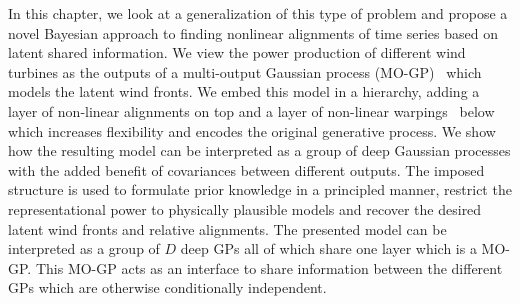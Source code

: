 In this chapter, we look at a generalization of this type of problem and propose a novel Bayesian approach to finding nonlinear alignments of time series based on latent shared information.
We view the power production of different wind turbines as the outputs of a multi-output Gaussian process (MO-GP)~\parencite{alvarez_kernels_2011} which models the latent wind fronts.
We embed this model in a hierarchy, adding a layer of non-linear alignments on top and a layer of non-linear warpings~\parencite{snelson_warped_2004,lazaro-gredilla_bayesian_2012} below which increases flexibility and encodes the original generative process.
We show how the resulting model can be interpreted as a group of deep Gaussian processes with the added benefit of covariances between different outputs.
The imposed structure is used to formulate prior knowledge in a principled manner, restrict the representational power to physically plausible models and  recover the desired latent wind fronts and relative alignments.
The presented model can be interpreted as a group of $D$ deep GPs all of which share one layer which is a MO-GP.
This MO-GP acts as an interface to share information between the different GPs which are otherwise conditionally independent.


